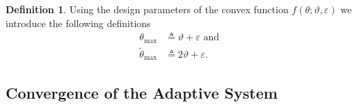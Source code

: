\documentclass[10pt,journal]{IEEEtran}
\theoremstyle{plain}%
\newtheorem{lem}[thm]{Lemma}
\theoremstyle{definition}
\newtheorem{defn}{Definition}%
\newtheorem{rem}{Remark}
\newcommand{\be}[0]{\begin{equation}}
\newcommand{\ee}[0]{\end{equation}}
\newcommand{\norms}[1]{\lVert#1\rVert}
\newcommand{\normB}[0]{\norms}
\let\norm=\normB
\begin{document}
\begin{defn}
Using the design parameters of the convex function $f(\theta;\vartheta,\varepsilon)$ we introduce the following definitions
\be\begin{split}\label{tmaxdef}
\theta_\text{max}&\triangleq  \vartheta+\varepsilon \text{ and }\\
\tilde\theta_\text{max} &\triangleq 2\vartheta+\varepsilon.
\end{split}\ee
\end{defn}

%
%
%



\subsection{Convergence of the Adaptive System}
\end{document}
